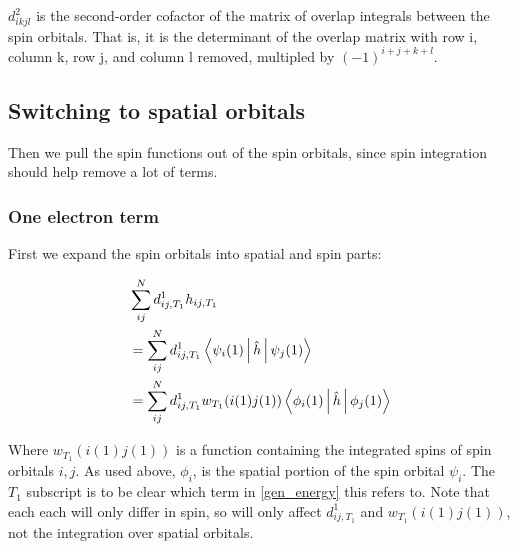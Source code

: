 \documentclass[a4paper]{article}
\begin{document}
    $d^2_{ikjl}$ is the second-order cofactor of the matrix of overlap integrals                                                                                                                               
    between the spin orbitals. That is, it is the determinant of the overlap                                                                                                                                 
    matrix with row i, column k, row j, and column l removed,                                                                                                                                                
    multipled by $(-1)^{i+j+k+l}$. 

\subsection{ Switching to spatial orbitals }
Then we pull the spin functions out of the spin orbitals, since spin integration should help remove a lot of terms. 

\subsubsection{One electron term}

First we expand the spin orbitals into spatial and spin parts:

\begin{equation}
 \begin{aligned}
  & \displaystyle \sum_{ij}^{N} d^1_{ij,T_1} h_{ij,T_1}                \\                                                                                                                                             
 &=  \displaystyle \sum_{ij}^{N} d^1_{ij,T_1} \Braket{ \psi_{i}(1)  | \hat{h}| \psi_{j}(1)  }      \\                                                                                                                                             
 &=  \displaystyle \sum_{ij}^{N} d^1_{ij,T_1}  w_{T_1}( i(1) j(1) ) \Braket{ \phi_{i}(1)  | \hat{h}| \phi_{j}(1)  } 
 \label{onee}
     \end{aligned}
     \end{equation}

Where $w_{T_1}( i(1) j(1) )$ is a function containing the integrated spins of spin orbitals $i,j$. As used above, $\phi_i$, is the spatial portion of the spin orbital $\psi_i$. The $T_1$ subscript is to be clear which term in \ref{gen_energy} this refers to. Note that each each will only differ in spin, so will only affect $d^1_{ij, T_1}$ and  $w_{T_1}( i(1) j(1) )$, not the integration over spatial orbitals.
\end{document}
